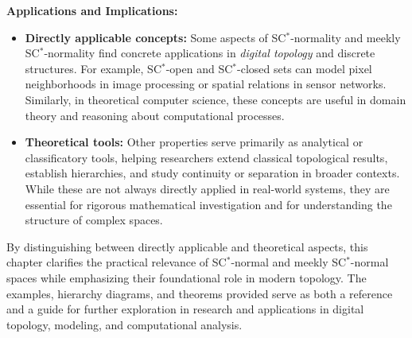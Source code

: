 \documentclass[12pt,a4paper,twoside]{report}  %
\theoremstyle{plain}
\theoremstyle{definition}
\begin{document}
\noindent \textbf{Applications and Implications:}
\begin{itemize}
    \item \textbf{Directly applicable concepts:} Some aspects of SC$^*$-normality and meekly SC$^*$-normality find concrete applications in \emph{digital topology} and discrete structures. For example, SC$^*$-open and SC$^*$-closed sets can model pixel neighborhoods in image processing or spatial relations in sensor networks. Similarly, in theoretical computer science, these concepts are useful in domain theory and reasoning about computational processes.  
    \item \textbf{Theoretical tools:} Other properties serve primarily as analytical or classificatory tools, helping researchers extend classical topological results, establish hierarchies, and study continuity or separation in broader contexts. While these are not always directly applied in real-world systems, they are essential for rigorous mathematical investigation and for understanding the structure of complex spaces.  
\end{itemize}

\noindent By distinguishing between directly applicable and theoretical aspects, this chapter clarifies the practical relevance of SC$^*$-normal and meekly SC$^*$-normal spaces while emphasizing their foundational role in modern topology. The examples, hierarchy diagrams, and theorems provided serve as both a reference and a guide for further exploration in research and applications in digital topology, modeling, and computational analysis.  









\end{document}
